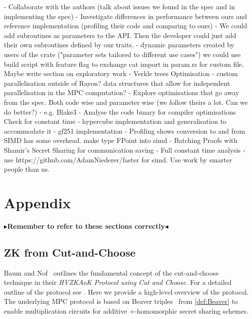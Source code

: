 \documentclass[11pt]{report}
\theoremstyle{definition}
\theoremstyle{plain}
\newcommand{\todo}[1]{{\color[rgb]{.5,0,0}\textbf{$\blacktriangleright$#1$\blacktriangleleft$}}}
\begin{document}
- Collaborate with the authors (talk about issues we found in the spec and in implementing the spec)
- Investigate differences in performance between ours and reference implementation (profiling their code and comparing to ours)
- We could add subroutines as parameters to the API. Then the developer could just add their own subroutines defined by our traits.
- dynamic parameters created by users of the crate ("parameter sets tailored to different use cases") we could use build script with feature flag to exchange cat import in param.rs for custom file. Maybe write section on exploratory work
- Verkle trees Optimisation
- custom parallelisation outside of Rayon? data structures that allow for independent parallelisation in the MPC computation?
- Explore optimisations that go away from the spec. Both code wise and parameter wise (we follow theirs a lot. Can we do better?)
- e.g. Blake3
- Analyse the code binary for compiler optimisations Check for constant time
- hypercube implementation and generalisation to accommodate it
- gf251 implementation
- Profiling shows conversion to and from SIMD has some overhead. make type FPoint into simd
- \cite[p26]{feneuil2023threshold} Batching Proofs with Shamir's Secret Sharing for communication saving
- Full constant time analysis
- use https://github.com/AdamNiederer/faster for simd. Use work by smarter people than us.



\cleardoublepage
{}




\cleardoublepage
\appendix
\chapter{Appendix}
\todo{Remember to refer to these sections correctly}

\section{ZK from Cut-and-Choose}\label{sec:zk-cut-and-choose}

Baum and Nof~\cite{baum2020concretely} outlines the fundamental concept of the cut-and-choose technique in their \textit{HVZKAoK Protocol using Cut and Choose}. For a detailed outline of the protocol see \cite[s3.2]{baum2020concretely}. Here we provide a high-level overview of the protocol. The underlying MPC protocol is based on Beaver triples~\cite{Beaver1992efficient} from \autoref{def:Beaver} to enable multiplication circuits for additive $+$-homomorphic secret sharing schemes.
\end{document}
